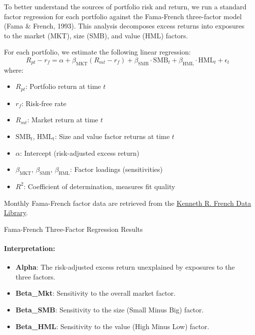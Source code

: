 \documentclass{article}
\begin{document}
To better understand the sources of portfolio risk and return, we run a standard factor regression for each portfolio against the Fama-French three-factor model (Fama \& French, 1993). This analysis decomposes excess returns into exposures to the market (MKT), size (SMB), and value (HML) factors.

For each portfolio, we estimate the following linear regression:
\[
R_{pt} - r_f = \alpha + \beta_{\mathrm{MKT}} (R_{mt} - r_f) + \beta_{\mathrm{SMB}} \cdot \mathrm{SMB}_t + \beta_{\mathrm{HML}} \cdot \mathrm{HML}_t + \epsilon_t
\]
where:
\begin{itemize}
    \item $R_{pt}$: Portfolio return at time $t$
    \item $r_f$: Risk-free rate
    \item $R_{mt}$: Market return at time $t$
    \item $\mathrm{SMB}_t$, $\mathrm{HML}_t$: Size and value factor returns at time $t$
    \item $\alpha$: Intercept (risk-adjusted excess return)
    \item $\beta_{\mathrm{MKT}}$, $\beta_{\mathrm{SMB}}$, $\beta_{\mathrm{HML}}$: Factor loadings (sensitivities)
    \item $R^2$: Coefficient of determination, measures fit quality
\end{itemize}


Monthly Fama-French factor data are retrieved from the \href{https://mba.tuck.dartmouth.edu/pages/faculty/ken.french/data_library.html}{Kenneth R. French Data Library}.


\begin{table}[htbp]
\centering
\caption{Fama-French Three-Factor Regression Results}
\label{tab:stats_capm}
\begin{adjustbox}{max width=\textwidth}
    
\end{adjustbox}
\end{table}


\paragraph{Interpretation:}
\begin{itemize}
    \item \textbf{Alpha}: The risk-adjusted excess return unexplained by exposures to the three factors.
    \item \textbf{Beta\_Mkt}: Sensitivity to the overall market factor.
    \item \textbf{Beta\_SMB}: Sensitivity to the size (Small Minus Big) factor.
    \item \textbf{Beta\_HML}: Sensitivity to the value (High Minus Low) factor.
\end{itemize}
\end{document}

